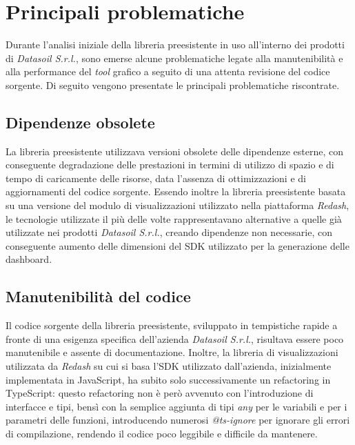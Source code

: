 \section{Principali problematiche}
Durante l'analisi iniziale della libreria preesistente in uso all'interno dei prodotti di \textit{Datasoil S.r.l.}, sono emerse alcune problematiche
legate alla manutenibilità e alla performance del \textit{tool} grafico a seguito di una attenta revisione del codice sorgente. \newline
Di seguito vengono presentate le principali problematiche riscontrate.

\subsection{Dipendenze obsolete}
La libreria preesistente utilizzava versioni obsolete delle dipendenze esterne, con conseguente degradazione delle prestazioni in termini
di utilizzo di spazio e di tempo di caricamente delle risorse, data l'assenza di ottimizzazioni e di aggiornamenti del codice sorgente. \newline
Essendo inoltre la libreria preesistente basata su una versione del modulo di visualizzazioni utilizzato nella piattaforma \textit{Redash},
le tecnologie utilizzate il più delle volte rappresentavano alternative a quelle già utilizzate nei prodotti \textit{Datasoil S.r.l.}, creando dipendenze
non necessarie, con conseguente aumento delle dimensioni del SDK utilizzato per la generazione delle dashboard.

\subsection{Manutenibilità del codice}
Il codice sorgente della libreria preesistente, sviluppato in tempistiche rapide a fronte di una esigenza specifica dell'azienda \textit{Datasoil S.r.l.},
risultava essere poco manutenibile e assente di documentazione. \newline
Inoltre, la libreria di visualizzazioni utilizzata da \textit{Redash} su cui si basa l'SDK utilizzato dall'azienda, inizialmente implementata in JavaScript,
ha subito solo successivamente un refactoring in TypeScript: questo refactoring non è però avvenuto con l'introduzione di interfacce e tipi, bensì con la semplice aggiunta
di tipi \textit{any} per le variabili e per i parametri delle funzioni, introducendo numerosi \textit{@ts-ignore} per ignorare gli errori di compilazione, rendendo il codice
poco leggibile e difficile da mantenere.

